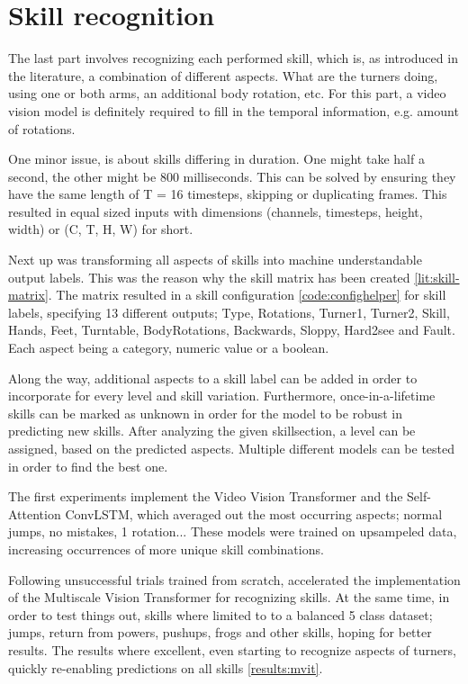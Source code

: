 \section{Skill recognition}
\label{methodology:skill-recognition}

The last part involves recognizing each performed skill, which is, as introduced in the literature, a combination of different aspects. What are the turners doing, using one or both arms, an additional body rotation, etc.
For this part, a video vision model is definitely required to fill in the temporal information, e.g. amount of rotations.

One minor issue, is about skills differing in duration. One might take half a second, the other might be 800 milliseconds.
This can be solved by ensuring they have the same length of T = 16 timesteps, skipping or duplicating frames. This resulted in equal sized inputs with dimensions (channels, timesteps, height, width) or (C, T, H, W) for short.

Next up was transforming all aspects of skills into machine understandable output labels. This was the reason why the skill matrix has been created \ref{lit:skill-matrix}. The matrix resulted in a skill configuration \ref{code:confighelper} for skill labels, specifying 13 different outputs; Type, Rotations, Turner1, Turner2, Skill, Hands, Feet, Turntable, BodyRotations, Backwards, Sloppy, Hard2see and Fault. Each aspect being a category, numeric value or a boolean.

Along the way, additional aspects to a skill label can be added in order to incorporate for every level and skill variation.
Furthermore, once-in-a-lifetime skills can be marked as unknown in order for the model to be robust in predicting new skills. After analyzing the given skillsection, a level can be assigned, based on the predicted aspects.
Multiple different models can be tested in order to find the best one.

The first experiments implement the Video Vision Transformer and the Self-Attention ConvLSTM, which averaged out the most occurring aspects; normal jumps, no mistakes, 1 rotation...
These models were trained on upsampeled data, increasing occurrences of more unique skill combinations.

Following unsuccessful trials trained from scratch, accelerated the implementation of the Multiscale Vision Transformer for recognizing skills. At the same time, in order to test things out, skills where limited to to a balanced 5 class dataset; jumps, return from powers, pushups, frogs and other skills, hoping for better results.
The results where excellent, even starting to recognize aspects of turners, quickly re-enabling predictions on all skills \ref{results:mvit}.

